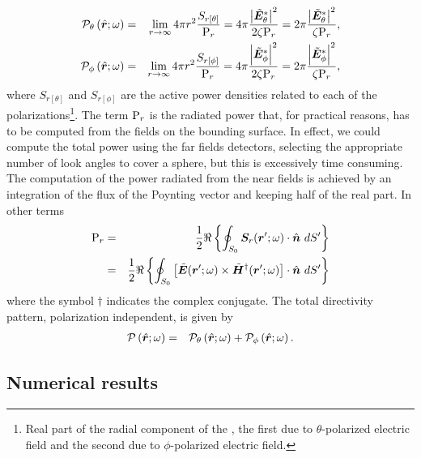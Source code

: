 \begin{eqnarray}
\mathcal{P}_\theta \left ( \hat{\mbfit{r}}; \omega \right ) &= & \lim_{r \to \infty} 4 \pi r^2 \frac{S_{r[\theta]}}{\mrm{P}_r} = 4 \pi \frac{\left | \tilde{\mbfit{E}}_\theta^{*} \right |^2}{2 \zeta \mrm{P}_r} = 2 \pi \frac{\left | \tilde{\mbfit{E}}_\theta^{*} \right |^2}{ \zeta \mrm{P}_r}, \label{eq:patternForm1} \\
\mathcal{P}_\phi \left ( \hat{\mbfit{r}}; \omega \right ) &= &  \lim_{r \to \infty} 4 \pi r^2 \frac{S_{r[\phi]}}{\mrm{P}_r} = 4 \pi \frac{\left | \tilde{\mbfit{E}}_\phi^{*} \right |^2}{2 \zeta \mrm{P}_r} = 2 \pi \frac{\left | \tilde{\mbfit{E}}_\phi^{*} \right |^2}{ \zeta \mrm{P}_r},\label{eq:patternForm2}
\end{eqnarray} where $S_{r[\theta]}$ and $S_{r[\phi]}$ are the active power densities related to each of the polarizations\footnote{Real part of the radial component of the , the first due to $\theta$-polarized electric field and the second due to $\phi$-polarized electric field.}. The term ${\mathrm{P}_r}$ is the radiated power that, for practical reasons, has to be computed from the fields on the bounding surface. In effect, we could compute the total power using the far fields detectors, selecting the appropriate number of look angles to cover a sphere, but this is excessively time consuming. The computation of the power radiated from the near fields is achieved by an integration of the flux of the Poynting vector and keeping half of the real part. In other terms
\begin{eqnarray}
\label{eq:Pr}
\mrm{P}_r &= & \frac{1}{2} \Re \left \{ \oint_{S_0} \mbfit{S}_r(\mbfit{r'};\omega) \cdot \hat{\mbfit{n}} \ dS' \right \} \nonumber \\
&= & \frac{1}{2} \Re \left \{ \oint_{S_0} \left [ \tilde{\mbfit{E}}(\mbfit{r'};\omega) \times \tilde{\mbfit{H}}^{\dagger}(\mbfit{r'};\omega) \right ] \cdot \hat{\mbfit{n}} \ dS' \right \}
\end{eqnarray} where the symbol $\dagger$ indicates the complex conjugate. The total directivity pattern, polarization independent, is given by
\begin{eqnarray}
\mathcal{P} \left ( \hat{\mbfit{r}}; \omega \right ) &= & \mathcal{P}_\theta \left ( \hat{\mbfit{r}}; \omega \right ) + \mathcal{P}_\phi \left ( \hat{\mbfit{r}}; \omega \right ).
\end{eqnarray}

\subsection{Numerical results} \label{sec:NumResChap1}

